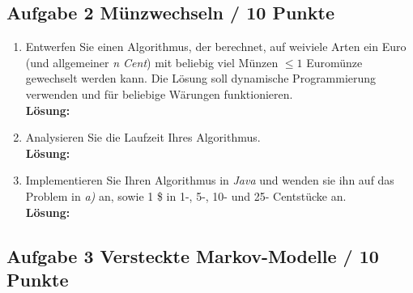 \documentclass[11pt,a4paper,ngerman]{article}
\begin{document}
\subsection*{Aufgabe 2 \mdseries Münzwechseln \mbox{} \hfill \underline \quad \; / 10 Punkte}

\begin{enumerate}[\bfseries (a)]



\item Entwerfen Sie einen Algorithmus, der berechnet, auf weiviele Arten ein Euro (und allgemeiner \emph{n Cent}) mit beliebig viel Münzen $\leq 1$ Euromünze gewechselt werden kann. Die Lösung soll dynamische Programmierung verwenden und für beliebige Wärungen funktionieren.\\

\textbf{Lösung:}


\item Analysieren Sie die Laufzeit Ihres Algorithmus.\\

\textbf{Lösung:}


\item Implementieren Sie Ihren Algorithmus in \emph{Java} und wenden sie ihn auf das Problem in \emph{a)} an, sowie 1 \$ in 1-, 5-, 10- und 25- Centstücke an.\\

\textbf{Lösung:}

\end{enumerate}


\subsection*{Aufgabe 3 \mdseries Versteckte Markov-Modelle \mbox{} \hfill \underline \quad \; / 10 Punkte}
\end{document}
